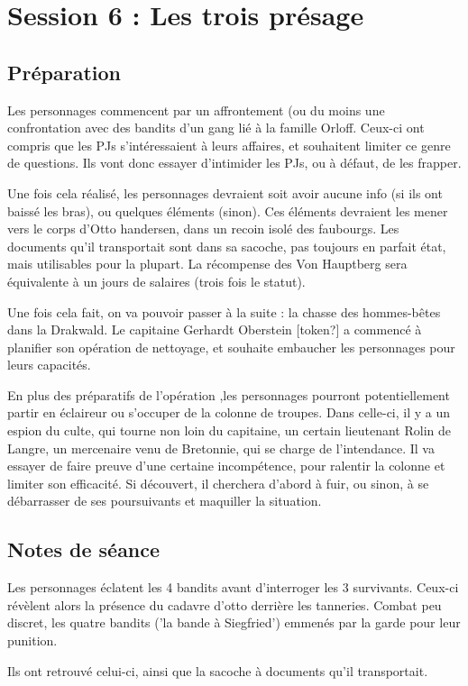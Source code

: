 \documentclass[10pt,a4paper]{book}
\begin{document}
\section{Session 6 : Les trois présage}
\subsection{Préparation}
Les personnages commencent par un affrontement (ou du moins une confrontation avec des bandits d'un gang lié à la famille Orloff. Ceux-ci ont compris que les PJs s'intéressaient à leurs affaires, et souhaitent limiter ce genre de questions. Ils vont donc essayer d'intimider les PJs, ou à défaut, de les frapper.

Une fois cela réalisé, les personnages devraient soit avoir aucune info (si ils ont baissé les bras), ou quelques éléments (sinon). Ces éléments devraient les mener vers le corps d'Otto handersen, dans un recoin isolé des faubourgs. Les documents qu'il transportait sont dans sa sacoche, pas toujours en parfait état, mais utilisables pour la plupart. La récompense des Von Hauptberg sera équivalente à un jours de salaires (trois fois le statut).

Une fois cela fait, on va pouvoir passer à la suite : la chasse des hommes-bêtes dans la Drakwald. Le capitaine Gerhardt Oberstein [token?] a commencé à planifier son opération de nettoyage, et souhaite embaucher les personnages pour leurs capacités.

En plus des préparatifs de l'opération ,les personnages pourront potentiellement partir en éclaireur ou s'occuper de la colonne de troupes. Dans celle-ci, il y a un espion du culte, qui tourne non loin du capitaine, un certain lieutenant Rolin de Langre, un mercenaire venu de Bretonnie, qui se charge de l'intendance. Il va essayer de faire preuve d'une certaine incompétence, pour ralentir la colonne et limiter son efficacité. Si découvert, il cherchera d'abord à fuir, ou sinon, à se débarrasser de ses poursuivants et maquiller la situation.
\subsection{Notes de séance}
Les personnages éclatent les 4 bandits avant d'interroger les 3 survivants. Ceux-ci révèlent alors la présence du cadavre d'otto derrière les tanneries.  Combat peu discret, les quatre bandits ('la bande à Siegfried') emmenés par la garde pour leur punition.

Ils ont retrouvé celui-ci, ainsi que la sacoche à documents qu'il transportait. 
\end{document}
